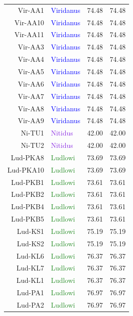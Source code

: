 \documentclass[10pt,letterpaper]{article}
\begin{document}
\begin{table}
\begin{tabular}{rlrr}
   Vir-AA1 & \textcolor{blue}{Viridanus} & 74.48 & 74.48 \\ 
   Vir-AA10 & \textcolor{blue}{Viridanus} & 74.48 & 74.48 \\ 
   Vir-AA11 & \textcolor{blue}{Viridanus} & 74.48 & 74.48 \\ 
   Vir-AA3 & \textcolor{blue}{Viridanus} & 74.48 & 74.48 \\ 
   Vir-AA4 & \textcolor{blue}{Viridanus} & 74.48 & 74.48 \\ 
   Vir-AA5 & \textcolor{blue}{Viridanus} & 74.48 & 74.48 \\ 
   Vir-AA6 & \textcolor{blue}{Viridanus} & 74.48 & 74.48 \\ 
   Vir-AA7 & \textcolor{blue}{Viridanus} & 74.48 & 74.48 \\ 
   Vir-AA8 & \textcolor{blue}{Viridanus} & 74.48 & 74.48 \\ 
   Vir-AA9 & \textcolor{blue}{Viridanus} & 74.48 & 74.48 \\ 
   \hline
   Ni-TU1 & \textcolor{BlueViolet}{Nitidus} & 42.00 & 42.00 \\ 
   Ni-TU2 & \textcolor{BlueViolet}{Nitidus} & 42.00 & 42.00 \\ 
      \hline
   Lud-PKA8 & \textcolor{ForestGreen}{Ludlowi} & 73.69 & 73.69 \\ 
   Lud-PKA10 & \textcolor{ForestGreen}{Ludlowi} & 73.69 & 73.69 \\ 
   Lud-PKB1 & \textcolor{ForestGreen}{Ludlowi} & 73.61 & 73.61 \\ 
   Lud-PKB2 & \textcolor{ForestGreen}{Ludlowi} & 73.61 & 73.61 \\ 
   Lud-PKB4 & \textcolor{ForestGreen}{Ludlowi} & 73.61 & 73.61 \\ 
   Lud-PKB5 & \textcolor{ForestGreen}{Ludlowi} & 73.61 & 73.61 \\ 
   Lud-KS1 & \textcolor{ForestGreen}{Ludlowi} & 75.19 & 75.19 \\ 
   Lud-KS2 & \textcolor{ForestGreen}{Ludlowi} & 75.19 & 75.19 \\ 
   Lud-KL6 & \textcolor{ForestGreen}{Ludlowi} & 76.37 & 76.37 \\ 
   Lud-KL7 & \textcolor{ForestGreen}{Ludlowi} & 76.37 & 76.37 \\ 
   Lud-KL1 & \textcolor{ForestGreen}{Ludlowi} & 76.37 & 76.37 \\ 
   Lud-PA1 & \textcolor{ForestGreen}{Ludlowi} & 76.97 & 76.97 \\ 
   Lud-PA2 & \textcolor{ForestGreen}{Ludlowi} & 76.97 & 76.97 \\ 

\end{tabular}
\end{table}
\end{document}
